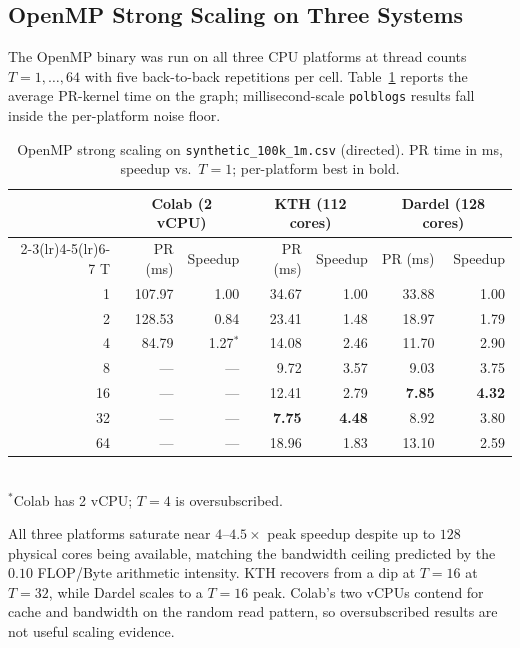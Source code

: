 \documentclass[11pt]{article}
\begin{document}
\subsection{OpenMP Strong Scaling on Three Systems}
\label{subsec:openmp-three}

The OpenMP binary was run on all three CPU platforms at thread counts
$T{=}1,\dots,64$ with five back-to-back repetitions per cell.
Table~\ref{tab:openmp-three-systems} reports the average PR-kernel time
on the  graph; millisecond-scale
\texttt{polblogs} results fall inside the per-platform noise floor.

\begin{table}[H]
\centering
\caption{OpenMP strong scaling on \texttt{synthetic\_100k\_1m.csv}
(directed). PR time in ms, speedup vs.\ $T{=}1$; per-platform best in bold.}
\label{tab:openmp-three-systems}
\small
\begin{tabular}{r rr rr rr}
\toprule
 & \multicolumn{2}{c}{Colab (2 vCPU)} & \multicolumn{2}{c}{KTH (112 cores)} & \multicolumn{2}{c}{Dardel (128 cores)} \\
\cmidrule(lr){2-3}\cmidrule(lr){4-5}\cmidrule(lr){6-7}
T & PR (ms) & Speedup & PR (ms) & Speedup & PR (ms) & Speedup \\
\midrule
1  & 107.97 & 1.00          & 34.67  & 1.00          & 33.88 & 1.00 \\
2  & 128.53 & 0.84          & 23.41  & 1.48          & 18.97 & 1.79 \\
4  & 84.79  & 1.27$^\ast$   & 14.08  & 2.46          & 11.70 & 2.90 \\
8  & ---    & ---           &  9.72  & 3.57          &  9.03 & 3.75 \\
16 & ---    & ---           & 12.41  & 2.79          & \textbf{7.85} & \textbf{4.32} \\
32 & ---    & ---           & \textbf{7.75} & \textbf{4.48} &  8.92 & 3.80 \\
64 & ---    & ---           & 18.96 & 1.83          & 13.10 & 2.59 \\
\bottomrule
\end{tabular}
\\[2pt]
\footnotesize $^\ast$Colab has 2 vCPU; $T{=}4$ is oversubscribed.
\end{table}

All three platforms saturate near $4$--$4.5\times$ peak speedup despite
up to $128$ physical cores being available, matching the bandwidth
ceiling predicted by the $0.10$ FLOP/Byte arithmetic intensity. KTH
recovers from a dip at $T{=}16$ at $T{=}32$, while Dardel scales to a
$T{=}16$ peak. Colab's two vCPUs contend for cache and bandwidth on
the random read pattern, so oversubscribed results are not useful
scaling evidence.
\end{document}
